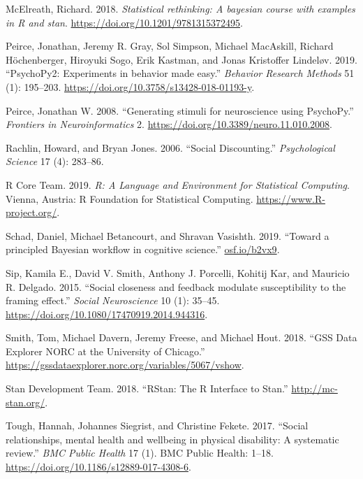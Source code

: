 \documentclass[smallextended]{svjour3}       %
\begin{document}
\leavevmode\hypertarget{ref-McElreath2018}{}%
McElreath, Richard. 2018. \emph{Statistical rethinking: A bayesian
course with examples in R and stan}.
\url{https://doi.org/10.1201/9781315372495}.

\leavevmode\hypertarget{ref-Peirce2019}{}%
Peirce, Jonathan, Jeremy R. Gray, Sol Simpson, Michael MacAskill,
Richard Höchenberger, Hiroyuki Sogo, Erik Kastman, and Jonas Kristoffer
Lindeløv. 2019. ``PsychoPy2: Experiments in behavior made easy.''
\emph{Behavior Research Methods} 51 (1): 195--203.
\url{https://doi.org/10.3758/s13428-018-01193-y}.

\leavevmode\hypertarget{ref-Peirce2008}{}%
Peirce, Jonathan W. 2008. ``Generating stimuli for neuroscience using
PsychoPy.'' \emph{Frontiers in Neuroinformatics} 2.
\url{https://doi.org/10.3389/neuro.11.010.2008}.

\leavevmode\hypertarget{ref-Rachlin2006}{}%
Rachlin, Howard, and Bryan Jones. 2006. ``Social Discounting.''
\emph{Psychological Science} 17 (4): 283--86.

\leavevmode\hypertarget{ref-R2019}{}%
R Core Team. 2019. \emph{R: A Language and Environment for Statistical
Computing}. Vienna, Austria: R Foundation for Statistical Computing.
\url{https://www.R-project.org/}.

\leavevmode\hypertarget{ref-Schad2019}{}%
Schad, Daniel, Michael Betancourt, and Shravan Vasishth. 2019. ``Toward
a principled Bayesian workflow in cognitive science.''
\url{osf.io/b2vx9}.

\leavevmode\hypertarget{ref-Sip2015}{}%
Sip, Kamila E., David V. Smith, Anthony J. Porcelli, Kohitij Kar, and
Mauricio R. Delgado. 2015. ``Social closeness and feedback modulate
susceptibility to the framing effect.'' \emph{Social Neuroscience} 10
(1): 35--45. \url{https://doi.org/10.1080/17470919.2014.944316}.

\leavevmode\hypertarget{ref-GSS2018}{}%
Smith, Tom, Michael Davern, Jeremy Freese, and Michael Hout. 2018. ``GSS
Data Explorer \textbar{} NORC at the University of Chicago.''
\url{https://gssdataexplorer.norc.org/variables/5067/vshow}.

\leavevmode\hypertarget{ref-Rstan2018}{}%
Stan Development Team. 2018. ``RStan: The R Interface to Stan.''
\url{http://mc-stan.org/}.

\leavevmode\hypertarget{ref-Tough2017}{}%
Tough, Hannah, Johannes Siegrist, and Christine Fekete. 2017. ``Social
relationships, mental health and wellbeing in physical disability: A
systematic review.'' \emph{BMC Public Health} 17 (1). BMC Public Health:
1--18. \url{https://doi.org/10.1186/s12889-017-4308-6}.
\end{document}
